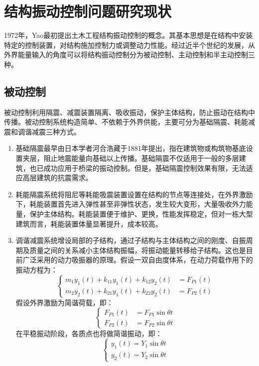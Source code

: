 \section{结构振动控制问题研究现状}
1972年，Yao最初提出土木工程结构振动控制的概念\cite{yao1972concept}。其基本思想是在结构中安装特定的控制装置，对结构施加控制力或调整动力性能。经过近半个世纪的发展，从外界能量输入的角度可以将结构振动控制分为被动控制、主动控制和半主动控制三种。

\subsection{被动控制}
被动控制利用隔震、减震装置隔离、吸收振动，保护主体结构，防止振动在结构中传播。被动控制系统构造简单、不依赖于外界供能，主要可分为基础隔震、耗能减震和调谐减震三种方式。\cite{Zhou1997}
\begin{enumerate}
\item 基础隔震最早由日本学者河合浩藏于1881年提出，指在建筑物或构筑物基底设置夹层，阻止地震能量向基础以上传播。基础隔震不仅适用于一般的多层建筑，也已成功应用于桥梁的振动控制。但是，基础隔震控制效果有限，无法适应高层建筑的抗震需求。\cite{Sun2012}
\item 耗能隔震系统将阻尼等耗能吸震装置设置在结构的节点等连接处，在外界激励下，耗能装置首先进入弹性甚至非弹性状态，发生较大变形，大量吸收外力能量，保护主体结构。耗能装置便于维护、更换，性能发挥稳定，但对一栋大型建筑而言，耗能装置体量显著提升，成本较高。
\item 调谐减震系统增设局部的子结构，通过子结构与主体结构之间的刚度、自振周期及质量之间的关系减小主体结构振幅，将振动能量转移给子结构。这也是目前广泛采用的动力吸振器的原理。假设一双自由度体系，在动力荷载作用下的振动方程为：
\begin{equation}
\label{vibration}
\left\{
\begin{array}{rl}
m_1\ddot{y_1}\left(t\right)+k_{11}y_1\left(t\right)+k_{12}y_2\left(t\right)&=F_{P1}\left(t\right)\\
m_2\ddot{y_2}\left(t\right)+k_{21}y_1\left(t\right)+k_{22}y_2\left(t\right)&=F_{P2}\left(t\right)
\end{array}
\right.
\end{equation}
假设外界激励为简谐荷载，即：
\begin{equation}
\label{sin}
\left\{
\begin{array}{rl}
F_{P1}\left(t\right)&=F_{P1}\sin \theta t\\
F_{P2}\left(t\right)&=F_{P2}\sin \theta t
\end{array}
\right.
\end{equation}
在平稳振动阶段，各质点也将做简谐振动，即：
\begin{equation}
\label{sinMove}
\left\{
\begin{array}{rl}
y_{1}\left(t\right)=Y_{1}\sin \theta t\\
y_{2}\left(t\right)=Y_{2}\sin \theta t
\end{array}
\right.
\end{equation}


\end{enumerate}
